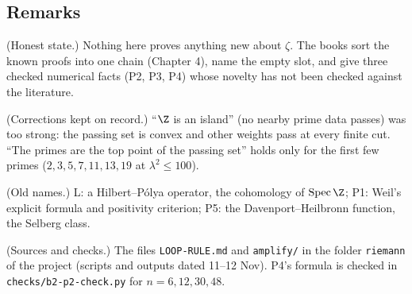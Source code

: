 \subsection*{Remarks}

\begin{lines}
\item[\lab{R1}] (Honest state.) Nothing here proves anything new about $\zeta$. The books sort the known proofs into one chain (Chapter 4), name the empty slot, and give three checked numerical facts (P2, P3, P4) whose novelty has not been checked against the literature.
\item[\lab{R2}] (Corrections kept on record.) ``$\Z$ is an island'' (no nearby prime data passes) was too strong: the passing set is convex and other weights pass at every finite cut. ``The primes are the top point of the passing set'' holds only for the first few primes ($2, 3, 5, 7, 11, 13, 19$ at $\lambda^2 \le 100$).
\item[\lab{R3}] (Old names.) L: a Hilbert--P\'olya operator, the cohomology of $\operatorname{Spec} \Z$; P1: Weil's explicit formula and positivity criterion; P5: the Davenport--Heilbronn function, the Selberg class.
\item[\lab{R4}] (Sources and checks.) The files \texttt{LOOP-RULE.md} and \texttt{amplify/} in the folder \texttt{riemann} of the project (scripts and outputs dated 11--12 Nov). P4's formula is checked in \texttt{checks/b2-p2-check.py} for $n = 6, 12, 30, 48$.
\end{lines}
